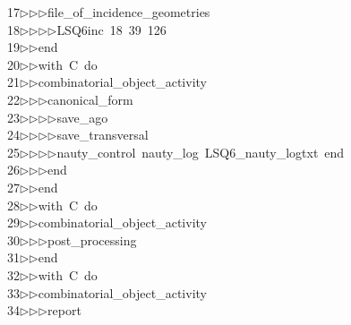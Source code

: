 \begin{tabbing}
17\>$\triangleright$\>$\triangleright$\>$\triangleright$\>file\_of\_incidence\_geometries\ \\[0pt]
18\>$\triangleright$\>$\triangleright$\>$\triangleright$\>$\triangleright$\>LSQ6inc\ 18\ 39\ 126\ \\[0pt]
19\>$\triangleright$\>$\triangleright$\>end\ \\[0pt]
20\>$\triangleright$\>$\triangleright$\>with\ C\ do\ \\[0pt]
21\>$\triangleright$\>$\triangleright$\>combinatorial\_object\_activity\ \\[0pt]
22\>$\triangleright$\>$\triangleright$\>$\triangleright$\>canonical\_form\ \\[0pt]
23\>$\triangleright$\>$\triangleright$\>$\triangleright$\>$\triangleright$\>save\_ago\ \\[0pt]
24\>$\triangleright$\>$\triangleright$\>$\triangleright$\>$\triangleright$\>save\_transversal\ \\[0pt]
25\>$\triangleright$\>$\triangleright$\>$\triangleright$\>$\triangleright$\>nauty\_control\ nauty\_log\ LSQ6\_nauty\_logtxt\ end\ \\[0pt]
26\>$\triangleright$\>$\triangleright$\>$\triangleright$\>end\ \\[0pt]
27\>$\triangleright$\>$\triangleright$\>end\ \\[0pt]
28\>$\triangleright$\>$\triangleright$\>with\ C\ do\ \\[0pt]
29\>$\triangleright$\>$\triangleright$\>combinatorial\_object\_activity\ \\[0pt]
30\>$\triangleright$\>$\triangleright$\>$\triangleright$\>post\_processing\ \\[0pt]
31\>$\triangleright$\>$\triangleright$\>end\ \\[0pt]
32\>$\triangleright$\>$\triangleright$\>with\ C\ do\ \\[0pt]
33\>$\triangleright$\>$\triangleright$\>combinatorial\_object\_activity\ \\[0pt]
34\>$\triangleright$\>$\triangleright$\>$\triangleright$\>report\ \\[0pt]

\end{tabbing}
